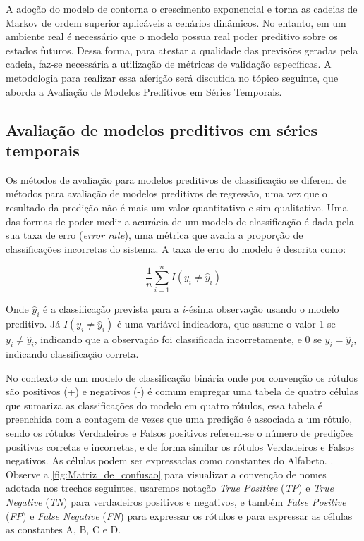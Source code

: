 \documentclass[
    12pt,                %
    openright,           %
    oneside,             %
    a4paper,             %
    english,             %
    brazil               %
]{abntex2}
\begin{document}
A adoção do modelo de  contorna o crescimento exponencial e torna as cadeias de Markov de ordem superior aplicáveis a cenários dinâmicos. No entanto, em um ambiente real é necessário que o modelo possua real poder preditivo sobre os estados futuros. Dessa forma, para atestar a qualidade das previsões geradas pela cadeia, faz-se necessária a utilização de métricas de validação específicas. A metodologia para realizar essa aferição será discutida no tópico seguinte, que aborda a Avaliação de Modelos Preditivos em Séries Temporais.
 
\subsection{Avaliação de modelos preditivos em séries temporais}
\label{avaliacao}

Os métodos de avaliação para modelos preditivos de classificação se diferem de métodos para avaliação de modelos preditivos de regressão, uma vez que o resultado da 
predição não é mais um valor quantitativo e sim qualitativo. Uma das formas de poder medir a acurácia de um modelo de classificação é dada pela sua taxa de erro 
(\textit{error rate}), uma métrica que avalia a proporção de classificações incorretas do sistema. A taxa de erro do modelo é descrita como:

\begin{equation}
    \frac{1}{n}\sum_{i=1}^{n} I(y_i \neq \hat{y}_i)
\end{equation}

Onde $\hat{y}_i$ é a classificação prevista para a $i$-ésima observação usando o modelo preditivo. Já $I(y_i \neq \hat{y}_i)$ é uma variável indicadora, que assume o 
valor 1 se $y_i \neq \hat{y}_i$, indicando que a observação foi classificada incorretamente, e 0 se $y_i = \hat{y}_i$, indicando classificação correta. \cite{JAMES2021}

No contexto de um modelo de classificação binária onde por convenção os rótulos são positivos (+) e negativos (-) é comum empregar uma tabela de quatro células que 
sumariza as classificações do modelo em quatro rótulos, essa tabela é preenchida com a contagem de vezes que uma predição é associada a um rótulo, sendo os rótulos 
Verdadeiros e Falsos positivos referem-se o número de predições positivas corretas e incorretas, e de forma similar os rótulos Verdadeiros e Falsos negativos. As 
células podem ser expressadas como constantes do Alfabeto. \cite{POWERS2020}. Observe a \autoref{fig:Matriz_de_confusao} para visualizar a convenção de nomes adotada 
nos trechos seguintes, usaremos notação \textit{True Positive} (\textit{TP}) e \textit{True Negative} (\textit{TN}) para verdadeiros positivos e negativos, e também 
\textit{False Positive} (\textit{FP}) e \textit{False Negative} (\textit{FN}) para expressar os rótulos e para expressar as células as constantes A, B, C e D. 
\end{document}
